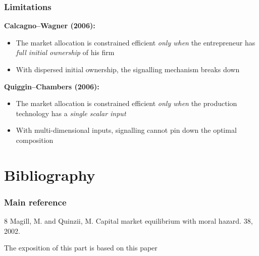 \documentclass[blue]{beamer}
\theoremstyle{definition}
\theoremstyle{example}
\begin{document}
\begin{frame}\frametitle{Limitations}
\textbf{Calcagno--Wagner (2006):}
\begin{itemize}
\item The market allocation is constrained efficient \emph{only when} the entrepreneur has \emph{full initial ownership} of his firm
\item With dispersed initial ownership, the signalling mechanism breaks down
\end{itemize}
\bigskip

\textbf{Quiggin--Chambers (2006):}
\begin{itemize}
\item The market allocation is constrained efficient \emph{only when} the production technology has a \emph{single scalar input}
\item With multi-dimensional inputs, signalling cannot pin down the optimal composition
\end{itemize}
\end{frame}

\section{Bibliography}

\begin{frame}\frametitle{Main reference}
\begin{thebibliography}{8}
\beamertemplatearticlebibitems
    Magill, M. and Quinzii, M.
    \newblock Capital market equilibrium with moral hazard.
     38, 2002.
\end{thebibliography}
\bigskip

The exposition of this part is based on this paper
\end{frame}
\end{document}
